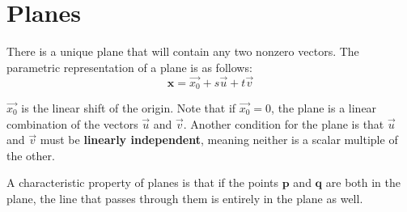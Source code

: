 \documentclass[11pt]{article}
\begin{document}
\section{Planes}
	There is a unique plane that will contain any two nonzero vectors. The parametric representation of a plane is as follows:
	\begin{equation}
		\mathbf{x} = \vec{x_0} + s\vec{u} + t\vec{v}
	\end{equation}
	
	$\vec{x_0}$ is the linear shift of the origin. Note that if $\vec{x_0} = 0$, the plane is a linear combination of the vectors $\vec{u}$ and $\vec{v}$. Another condition for the plane is that $\vec{u}$ and $\vec{v}$ must be \textbf{linearly independent}, meaning neither is a scalar multiple of the other.
	
	A characteristic property of planes is that if the points $\mathbf{p}$ and $\mathbf{q}$ are both in the plane, the line that passes through them is entirely in the plane as well.
	
\end{document}
